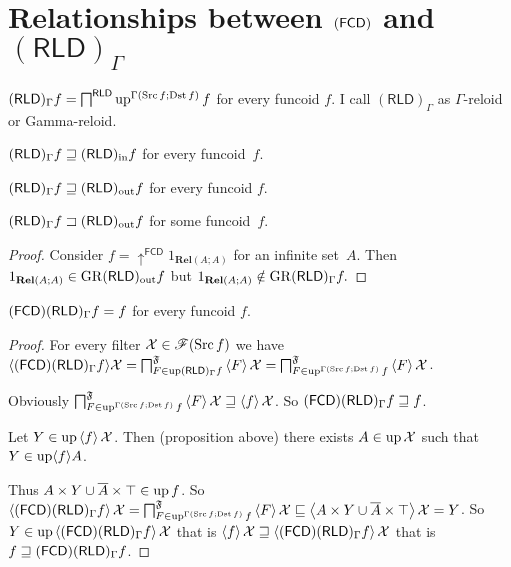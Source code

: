 \section{\texorpdfstring{Relationships between $\protect(\mathsf{FCD})$ and 
$(\mathsf{RLD})_{\Gamma}$}{Relationships between (FCD) and (RLD)\_Gamma}}
\begin{defn}
$(\mathsf{RLD})_{\Gamma}f=\bigsqcap^{\mathsf{RLD}}\operatorname{up}^{\Gamma(\operatorname{Src} f;\operatorname{Dst} f)}f$
for every funcoid $f$. I call $(\mathsf{RLD})_{\Gamma}$ as $\Gamma$-reloid
or Gamma-reloid.\end{defn}
\begin{conjecture}
$(\mathsf{RLD})_{\Gamma}f\sqsupseteq(\mathsf{RLD})_{\mathrm{in}} f$ for every funcoid~$f$.\end{conjecture}
\begin{obvious}
$(\mathsf{RLD})_{\Gamma}f\sqsupseteq(\mathsf{RLD})_{\mathrm{out}} f$ for every funcoid
$f$.\end{obvious}
\begin{example}
$(\mathsf{RLD})_{\Gamma}f\sqsupset(\mathsf{RLD})_{\mathrm{out}} f$ for some funcoid~$f$.\end{example}
\begin{proof}
Consider $f=\uparrow^{\mathsf{FCD}}1_{\mathbf{Rel}(A;A)}$ for an
infinite set~$A$. Then $1_{\mathbf{Rel}(A;A)}\in\operatorname{GR}(\mathsf{RLD})_{\mathrm{out}} f$
but $1_{\mathbf{Rel}(A;A)}\notin\operatorname{GR}(\mathsf{RLD})_{\Gamma}f.$\end{proof}
\begin{lem}
$(\mathsf{FCD})(\mathsf{RLD})_{\Gamma}f=f$ for every funcoid $f$.\end{lem}
\begin{proof}
For every filter $\mathcal{X}\in\mathscr{F}(\operatorname{Src} f)$ we have $\langle(\mathsf{FCD})(\mathsf{RLD})_{\Gamma}f\rangle\mathcal{X}=\bigsqcap_{F\in\operatorname{up}(\mathsf{RLD})_{\Gamma}f}^{\mathfrak{F}}\left\langle F\right\rangle\mathcal{X}=\bigsqcap_{F\in\operatorname{up}^{\Gamma(\operatorname{Src} f;\operatorname{Dst} f)}f}^{\mathfrak{F}}\left\langle F\right\rangle\mathcal{X}$.

Obviously $\bigsqcap_{F\in\operatorname{up}^{\Gamma(\operatorname{Src} f;\operatorname{Dst} f)}f}^{\mathfrak{F}}\left\langle F\right\rangle\mathcal{X}\sqsupseteq\left\langle f\right\rangle\mathcal{X}$.
So $(\mathsf{FCD})(\mathsf{RLD})_{\Gamma}f\sqsupseteq f$.

Let $Y\in\operatorname{up}\left\langle f\right\rangle\mathcal{X}$. Then (proposition above) there
exists $A\in\operatorname{up}\mathcal{X}$ such that $Y\in\operatorname{up}\langle f\rangle A$.

Thus $A\times Y\cup\overline{A}\times\top\in\operatorname{up} f$. So $\left\langle (\mathsf{FCD})(\mathsf{RLD})_{\Gamma}f\right\rangle\mathcal{X}=\bigsqcap_{F\in\operatorname{up}^{\Gamma(\operatorname{Src} f;\operatorname{Dst} f)}f}^{\mathfrak{F}}\left\langle F\right\rangle\mathcal{X}\sqsubseteq\left\langle A\times Y\cup\overline{A}\times\top\right\rangle\mathcal{X}=Y$.
So $Y\in\operatorname{up}\left\langle (\mathsf{FCD})(\mathsf{RLD})_{\Gamma}f\right\rangle\mathcal{X}$ that
is $\left\langle f\right\rangle\mathcal{X}\sqsupseteq\left\langle (\mathsf{FCD})(\mathsf{RLD})_{\Gamma}f\right\rangle\mathcal{X}$
that is $f\sqsupseteq(\mathsf{FCD})(\mathsf{RLD})_{\Gamma}f$.\end{proof}
